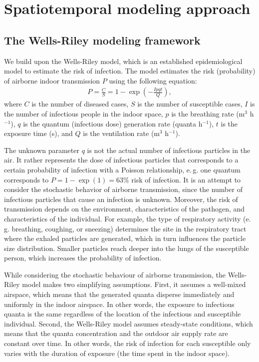 \documentclass[fleqn,11pt]{wlscirep_supp}
\newcommand\eg{e.\,g.\xspace}
\begin{document}
\clearpage

\section{Spatiotemporal modeling approach}\label{sec:spattemp-model}

\subsection{The Wells-Riley modeling framework}

We build upon the Wells-Riley model\cite{Riley1961Book}, which is an established epidemiological model to estimate the risk of infection. The model estimates the risk (probability) of airborne indoor transmission $P$ using the following equation: 
\begin{align}
    P = \frac{C}{S} = 1 - \exp \left(-\frac{Ipqt}{Q}\right),
\end{align}
where $C$ is the number of diseased cases, $S$ is the number of susceptible cases, $I$ is the number of infectious people in the indoor space, $p$ is the breathing rate (m$^3$ h$^{-1}$), $q$ is the quantum (infectious dose) generation rate (quanta h$^{-1}$), $t$ is the exposure time (s), and $Q$ is the ventilation rate (m$^3$ h$^{-1}$).

The unknown parameter $q$ is not the actual number of infectious particles in the air. It rather represents the dose of infectious particles that corresponds to a certain probability of infection with a Poisson relationship, \eg one quantum corresponds to $P = 1 - \exp (1) = 63\%$ risk of infection\cite{Rudnick2003IndoorAir}. It is an attempt to consider the stochastic behavior of airborne transmission, since the number of infectious particles that cause an infection is unknown. Moreover, the risk of transmission depends on the environment, characteristics of the pathogen, and characteristics of the individual. For example, the type of respiratory activity (\eg breathing, coughing, or sneezing) determines the site in the respiratory tract where the exhaled particles are generated, which in turn influences the particle size distribution\cite{Wei2016AMJIC}. Smaller particles reach deeper into the lungs of the susceptible person\cite{Wang2021Science}, which increases the probability of infection. 

While considering the stochastic behaviour of airborne transmission, the Wells-Riley model makes two simplifying assumptions. First, it assumes a well-mixed airspace, which means that the generated quanta disperse immediately and uniformly in the indoor airspace. In other words, the exposure to infectious quanta is the same regardless of the location of the infectious and susceptible individual. Second, the Wells-Riley model assumes steady-state conditions, which means that the quanta concentration and the outdoor air supply rate are constant over time. In other words, the risk of infection for each susceptible only varies with the duration of exposure (the time spent in the indoor space). 
\end{document}
